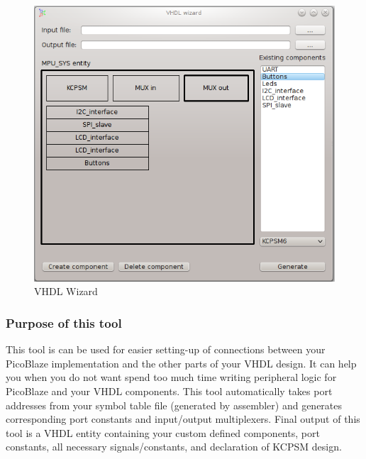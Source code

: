 \begin{figure}[h]
    \centering
    \includegraphics[width=.5\textwidth]{img/VHDL_wizard.png}
    \caption{VHDL Wizard}
\end{figure}

\subsubsection{Purpose of this tool}
    This tool is can be used for easier setting-up of connections between your PicoBlaze implementation and the other parts of your VHDL design. It can help you when you do not want spend too much time writing peripheral logic for PicoBlaze and your VHDL components. This tool automatically takes port addresses from your symbol table file (generated by assembler) and generates corresponding port constants and input/output multiplexers. Final output of this tool is a VHDL entity containing your custom defined components, port constants, all necessary signals/constants, and declaration of KCPSM design.

